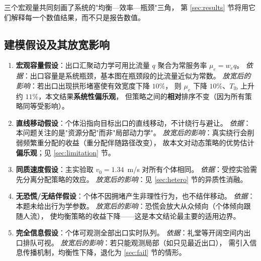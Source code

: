 三个宏观量共同刻画了系统的"均衡—效率—瓶颈"三角，
第 \ref{sec:results} 节将用它们解释每一个数值结果，而不只是报告数值。

\subsection{建模假设及其放宽影响}
\label{sec:assumptions}

\begin{csfasm}[建模假设与现实依据]
\begin{enumerate}[label=A\arabic*.]
  \item \textbf{宏观容量假设}：出口汇聚动力学可用比流量 $q$ 聚合为常服务率 $\mu_e=w_e q$。
        \emph{依据}：出口容量是系统瓶颈，基本图在瓶颈段的比流量近似为常数。
        \emph{放宽后的影响}：若出口出现拱形堵塞使有效宽度下降 $10\%$，
        则 $\mu_e$ 下降 $10\%$、$T_{\mathrm{lb}}$ 上升约 $11\%$，本文结果\textbf{系统性偏乐观}，
        但策略之间的\textbf{相对}排序不变（因为所有策略同等受影响）。
  \item \textbf{直线移动假设}：个体沿指向目标出口的直线移动，不计绕行与避让。
        \emph{依据}：本问题关注的是"资源分配"而非"局部动力学"。
        \emph{放宽后的影响}：真实绕行会削弱频繁重分配的收益（重分配伴随路径改变），
        故本文对动态策略的优势估计\textbf{偏乐观}；见 \ref{sec:limitation} 节。
  \item \textbf{同质速度假设}：主实验取 $v_0=1.34$~m/s 对所有个体相同。
        \emph{依据}：受控实验需先分离分配策略的效应。
        \emph{放宽后的影响}：见 \ref{sec:hetero} 节的异质性消融。
  \item \textbf{无恐慌/无结伴假设}：个体不因拥堵产生非理性行为，也不结伴移动。
        \emph{依据}：本题未给出行为学参数。
        \emph{放宽后的影响}：恐慌会放大从众倾向（个体倾向跟随人流），
        使均衡策略的收益下降——这是本文结论最主要的适用边界。
  \item \textbf{完全信息假设}：个体可观测全部出口实时队列。
        \emph{依据}：礼堂等开阔空间内出口排队可视。
        \emph{放宽后的影响}：若只能观测局部（如只见最近出口），
        需引入信息传播机制，均衡性下降，退化为 \ref{sec:fail} 节的情形。
\end{enumerate}
\end{csfasm}
